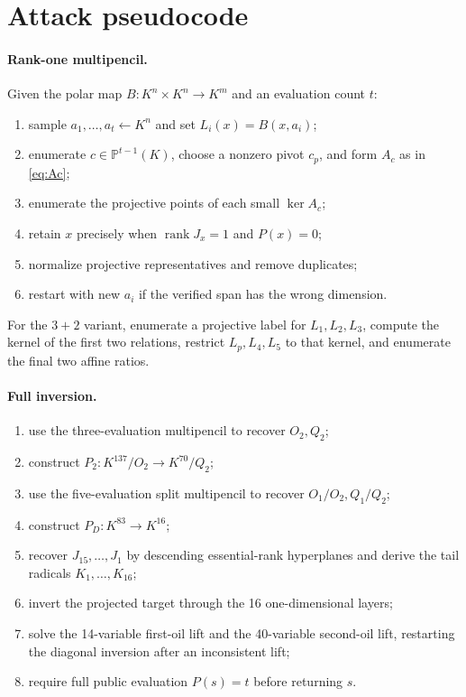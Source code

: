 \documentclass[11pt]{article}
\newcommand{\Proj}{\mathbb{P}}
\newcommand{\rank}{\operatorname{rank}}
\begin{document}
\appendix
\section{Attack pseudocode}

\paragraph{Rank-one multipencil.}
Given the polar map $B:K^n\times K^n\to K^m$ and an evaluation count $t$:
\begin{enumerate}[leftmargin=*,itemsep=1pt]
  \item sample $a_1,\ldots,a_t\leftarrow K^n$ and set
        $L_i(x)=B(x,a_i)$;
  \item enumerate $c\in\Proj^{t-1}(K)$, choose a nonzero pivot $c_p$, and
        form $A_c$ as in \eqref{eq:Ac};
  \item enumerate the projective points of each small $\ker A_c$;
  \item retain $x$ precisely when $\rank J_x=1$ and $P(x)=0$;
  \item normalize projective representatives and remove duplicates;
  \item restart with new $a_i$ if the verified span has the wrong dimension.
\end{enumerate}

For the $3+2$ variant, enumerate a projective label for $L_1,L_2,L_3$,
compute the kernel of the first two relations, restrict $L_p,L_4,L_5$ to that
kernel, and enumerate the final two affine ratios.

\paragraph{Full inversion.}
\begin{enumerate}[leftmargin=*,itemsep=1pt]
  \item use the three-evaluation multipencil to recover $O_2,Q_2$;
  \item construct $P_2:K^{137}/O_2\to K^{70}/Q_2$;
  \item use the five-evaluation split multipencil to recover
        $O_1/O_2,Q_1/Q_2$;
  \item construct $P_D:K^{83}\to K^{16}$;
  \item recover $J_{15},\ldots,J_1$ by descending essential-rank
        hyperplanes and derive the tail radicals $K_1,\ldots,K_{16}$;
  \item invert the projected target through the 16 one-dimensional layers;
  \item solve the 14-variable first-oil lift and the 40-variable second-oil
        lift, restarting the diagonal inversion after an inconsistent lift;
  \item require full public evaluation $P(s)=t$ before returning $s$.
\end{enumerate}
\end{document}
